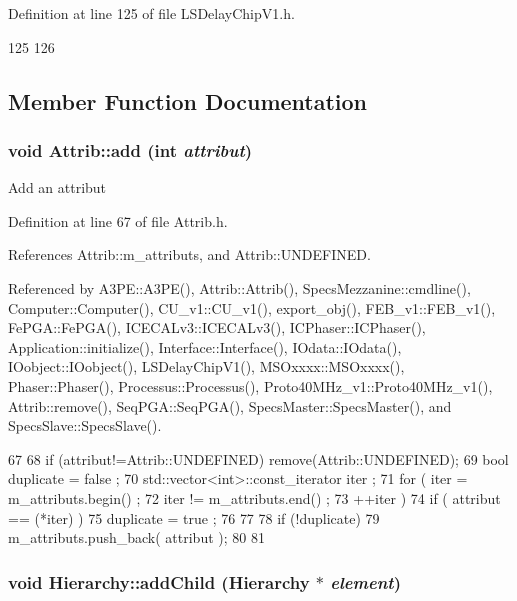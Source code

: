 Definition at line 125 of file LSDelayChipV1.h.


\begin{DoxyCode}
125                   {
126   }
\end{DoxyCode}


\subsection{Member Function Documentation}
\hypertarget{classAttrib_a235f773af19c900264a190b00a3b4ad7}{
\subsubsection[{add}]{\setlength{\rightskip}{0pt plus 5cm}void Attrib::add (int {\em attribut})}}
\label{classAttrib_a235f773af19c900264a190b00a3b4ad7}
Add an attribut 

Definition at line 67 of file Attrib.h.

References Attrib::m\_\-attributs, and Attrib::UNDEFINED.

Referenced by A3PE::A3PE(), Attrib::Attrib(), SpecsMezzanine::cmdline(), Computer::Computer(), CU\_\-v1::CU\_\-v1(), export\_\-obj(), FEB\_\-v1::FEB\_\-v1(), FePGA::FePGA(), ICECALv3::ICECALv3(), ICPhaser::ICPhaser(), Application::initialize(), Interface::Interface(), IOdata::IOdata(), IOobject::IOobject(), LSDelayChipV1(), MSOxxxx::MSOxxxx(), Phaser::Phaser(), Processus::Processus(), Proto40MHz\_\-v1::Proto40MHz\_\-v1(), Attrib::remove(), SeqPGA::SeqPGA(), SpecsMaster::SpecsMaster(), and SpecsSlave::SpecsSlave().


\begin{DoxyCode}
67                             {
68     if (attribut!=Attrib::UNDEFINED) remove(Attrib::UNDEFINED);
69     bool duplicate = false ;
70     std::vector<int>::const_iterator iter ;
71     for ( iter  = m_attributs.begin() ;
72           iter != m_attributs.end()   ;
73           ++iter ) {
74       if ( attribut == (*iter) ) {
75         duplicate = true ;
76       }
77     }
78     if (!duplicate) {
79       m_attributs.push_back( attribut );
80     }
81   }
\end{DoxyCode}
\hypertarget{classHierarchy_ad677774ff38fcb257c04a3a10d471fac}{
\subsubsection[{addChild}]{\setlength{\rightskip}{0pt plus 5cm}void Hierarchy::addChild ({\bf Hierarchy} $\ast$ {\em element})}}
\label{classHierarchy_ad677774ff38fcb257c04a3a10d471fac}


